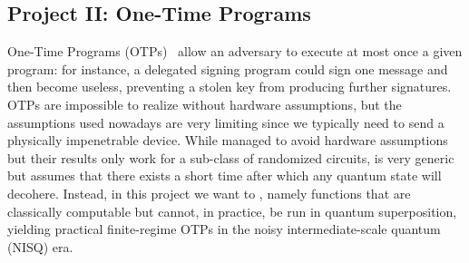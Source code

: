 

\subsection{Project II: One-Time Programs}

One-Time Programs (OTPs)~\cite{BGS13_QuantumOneTimePrograms} allow an adversary to execute at most once a given program: for instance, a delegated signing program could sign one message and then become useless, preventing a stolen key from producing further signatures. OTPs are impossible to realize without hardware assumptions, but the assumptions used nowadays are very limiting since we typically need to send a physically impenetrable device. While \cite{gupte_quantum_2025} managed to avoid hardware assumptions but their results only work for a sub-class of randomized circuits, \cite{Liu23_DepthBoundedQuantumCryptography} is very generic but assumes that there exists a short time after which any quantum state will decohere. Instead, in this project we want to , namely functions that are classically computable but cannot, in practice, be run in quantum superposition, yielding practical finite-regime OTPs in the noisy intermediate-scale quantum (NISQ) era.


